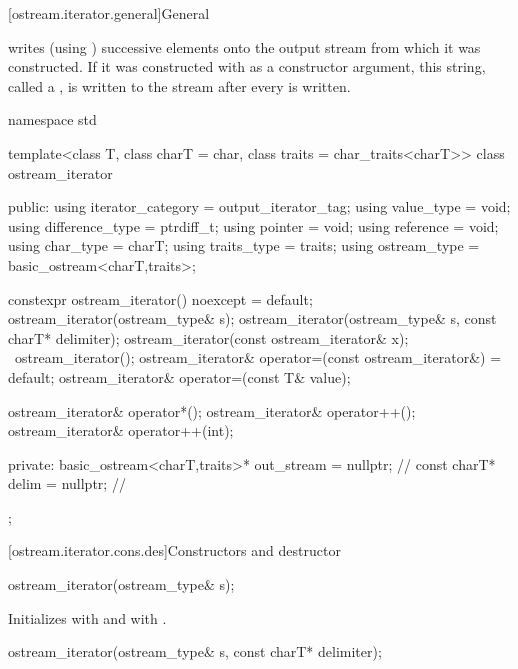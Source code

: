 [ostream.iterator.general]{General}

\pnum
{}%
writes (using
)
successive elements onto the output stream from which it was constructed.
If it was constructed with
as a constructor argument, this string, called a
,
is written to the stream after every
is written.

\begin{codeblock}
namespace std {
  template<class T, class charT = char, class traits = char_traits<charT>>
  class ostream_iterator {
  public:
    using iterator_category = output_iterator_tag;
    using value_type        = void;
    using difference_type   = ptrdiff_t;
    using pointer           = void;
    using reference         = void;
    using char_type         = charT;
    using traits_type       = traits;
    using ostream_type      = basic_ostream<charT,traits>;

    constexpr ostream_iterator() noexcept = default;
    ostream_iterator(ostream_type& s);
    ostream_iterator(ostream_type& s, const charT* delimiter);
    ostream_iterator(const ostream_iterator& x);
    ~ostream_iterator();
    ostream_iterator& operator=(const ostream_iterator&) = default;
    ostream_iterator& operator=(const T& value);

    ostream_iterator& operator*();
    ostream_iterator& operator++();
    ostream_iterator& operator++(int);

  private:
    basic_ostream<charT,traits>* out_stream = nullptr;          // \expos
    const charT* delim = nullptr;                               // \expos
  };
}
\end{codeblock}

[ostream.iterator.cons.des]{Constructors and destructor}

%
\begin{itemdecl}
ostream_iterator(ostream_type& s);
\end{itemdecl}

\begin{itemdescr}
\pnum
\effects
Initializes  with  and
 with .
\end{itemdescr}


%
\begin{itemdecl}
ostream_iterator(ostream_type& s, const charT* delimiter);
\end{itemdecl}

